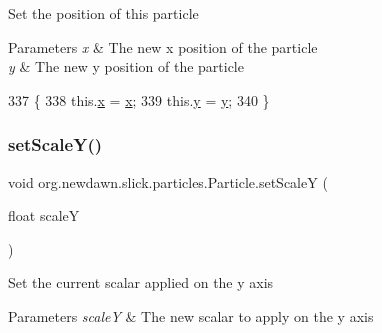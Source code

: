Set the position of this particle


\begin{DoxyParams}{Parameters}
{\em x} & The new x position of the particle \\
\hline
{\em y} & The new y position of the particle \\
\hline
\end{DoxyParams}

\begin{DoxyCode}
337                                               \{
338         this.\mbox{\hyperlink{classorg_1_1newdawn_1_1slick_1_1particles_1_1_particle_ae1ee7d5a72b34bbdb44110dfa2795674}{x}} = \mbox{\hyperlink{classorg_1_1newdawn_1_1slick_1_1particles_1_1_particle_ae1ee7d5a72b34bbdb44110dfa2795674}{x}};
339         this.\mbox{\hyperlink{classorg_1_1newdawn_1_1slick_1_1particles_1_1_particle_ad784e37c1fdad77abc886521b8e907b2}{y}} = \mbox{\hyperlink{classorg_1_1newdawn_1_1slick_1_1particles_1_1_particle_ad784e37c1fdad77abc886521b8e907b2}{y}};
340     \}
\end{DoxyCode}
\mbox{\label{classorg_1_1newdawn_1_1slick_1_1particles_1_1_particle_a13ad6fc66ed33031a6c26c51056fa39e}} 
\subsubsection{\texorpdfstring{set\+Scale\+Y()}{setScaleY()}}
{\footnotesize\ttfamily void org.\+newdawn.\+slick.\+particles.\+Particle.\+set\+ScaleY (\begin{DoxyParamCaption}\item[{float}]{scaleY }\end{DoxyParamCaption})\hspace{0.3cm}{\ttfamily [inline]}}

Set the current scalar applied on the y axis


\begin{DoxyParams}{Parameters}
{\em scaleY} & The new scalar to apply on the y axis \\
\hline
\end{DoxyParams}

